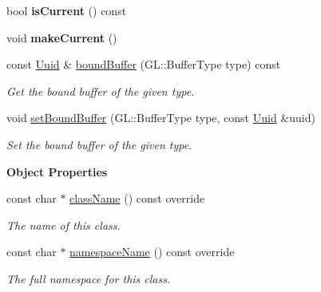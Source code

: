 \begin{Indent}
\begin{DoxyCompactItemize}
bool {\bfseries is\+Current} () const
\item 
\mbox{\label{classrev_1_1_render_context_a76846d20393eb2c1246f31cf084a1f72}} 
void {\bfseries make\+Current} ()
\item 
\mbox{\label{classrev_1_1_render_context_a2628ead4b6adce98d597522d38554e3a}} 
const \mbox{\hyperlink{classrev_1_1_uuid}{Uuid}} \& \mbox{\hyperlink{classrev_1_1_render_context_a2628ead4b6adce98d597522d38554e3a}{bound\+Buffer}} (G\+L\+::\+Buffer\+Type type) const
\begin{DoxyCompactList}\small\item\em Get the bound buffer of the given type. \end{DoxyCompactList}\item 
\mbox{\label{classrev_1_1_render_context_aa817e311494d01746f1547cd6e6baa1b}} 
void \mbox{\hyperlink{classrev_1_1_render_context_aa817e311494d01746f1547cd6e6baa1b}{set\+Bound\+Buffer}} (G\+L\+::\+Buffer\+Type type, const \mbox{\hyperlink{classrev_1_1_uuid}{Uuid}} \&uuid)
\begin{DoxyCompactList}\small\item\em Set the bound buffer of the given type. \end{DoxyCompactList}\end{DoxyCompactItemize}
\end{Indent}
\begin{Indent}\textbf{ Object Properties}\par
\begin{DoxyCompactItemize}
\item 
const char $\ast$ \mbox{\hyperlink{classrev_1_1_render_context_aabbf2a2fa99c196ee07208eb52b7f208}{class\+Name}} () const override
\begin{DoxyCompactList}\small\item\em The name of this class. \end{DoxyCompactList}\item 
const char $\ast$ \mbox{\hyperlink{classrev_1_1_render_context_a07d4f4c563a4bc001f83a6f657221c9d}{namespace\+Name}} () const override
\begin{DoxyCompactList}\small\item\em The full namespace for this class. \end{DoxyCompactList}\end{DoxyCompactItemize}
\end{Indent}
